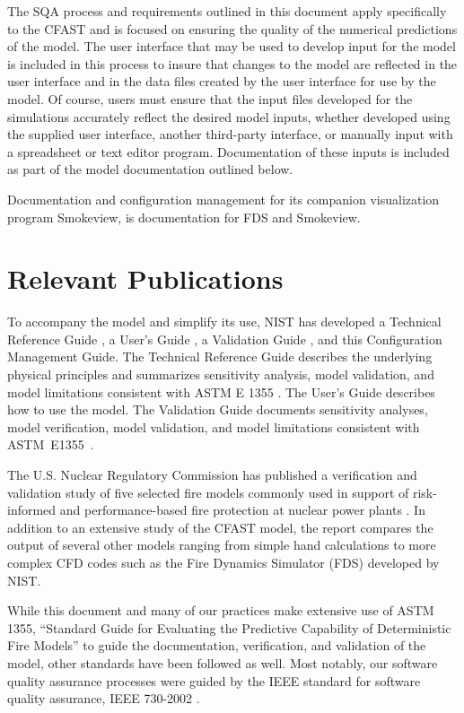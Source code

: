 \documentclass[12pt]{book}
\begin{document}
The SQA process and requirements outlined in this document apply specifically to the CFAST and is focused on ensuring the quality of the numerical predictions of the model.  The user interface that may be used to develop input for the model is included in this process to insure that changes to the model are reflected in the user interface and in the data files created by the user interface for use by the model.  Of course, users must ensure that the input files developed for the simulations accurately reflect the desired model inputs, whether developed using the supplied user interface, another third-party interface, or manually input with a spreadsheet or text editor program.  Documentation of these inputs is included as part of the model documentation outlined below.

Documentation and configuration management for its companion visualization program Smokeview, is documentation for FDS and Smokeview.

\chapter{Relevant Publications}

To accompany the model and simplify its use, NIST has developed a Technical Reference Guide \cite{CFAST_Tech_Guide_7}, a User's Guide \cite{CFAST_Users_Guide_7}, a Validation Guide \cite{CFAST_Valid_Guide_7}, and this Configuration Management Guide.  The Technical Reference Guide describes the underlying physical principles and summarizes sensitivity analysis, model validation, and model limitations consistent with ASTM E 1355 \cite{ASTM:E1355}.  The User's Guide describes how to use the model.  The Validation Guide documents sensitivity analyses, model verification, model validation, and model limitations consistent with ASTM~E1355~\cite{ASTM:E1355}.

The U.S. Nuclear Regulatory Commission has published a verification and validation study of five selected fire models commonly used in support of risk-informed and performance-based fire protection at nuclear power plants \cite{NRCNUREG1824}. In addition to an extensive study of the CFAST model, the report compares the output of several other models ranging from simple hand calculations to more complex CFD codes such as the Fire Dynamics Simulator (FDS) developed by NIST.

While this document and many of our practices make extensive use of ASTM 1355, ``Standard Guide for Evaluating the Predictive Capability of Deterministic Fire Models'' \cite{ASTM:E1355} to guide the documentation, verification, and validation of the model, other standards have been followed as well.  Most notably, our software quality assurance processes were guided by the IEEE standard for software quality assurance, IEEE 730-2002 \cite{IEEE:730}.
\end{document}
